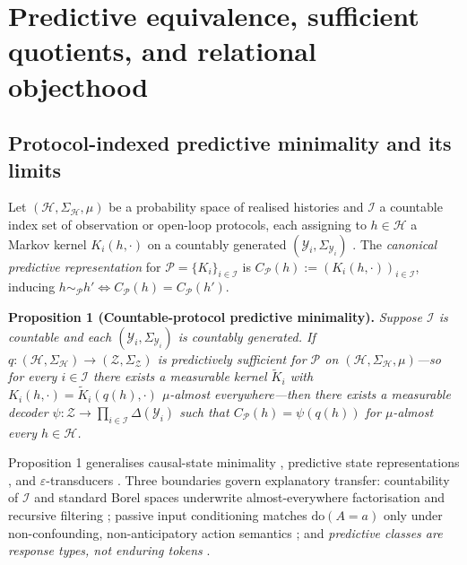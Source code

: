 \documentclass[12pt,letterpaper]{article}
\begin{document}
\section{Predictive equivalence, sufficient quotients, and relational
objecthood}\label{predictive-equivalence-sufficient-quotients-and-relational-objecthood}

\subsection{Protocol-indexed predictive minimality and its
limits}\label{protocol-indexed-predictive-minimality-and-its-limits}

Let \((\mathcal{H}, \Sigma_{\mathcal{H}}, \mu)\) be a probability space
of realised histories and \(\mathcal{I}\) a countable index set of
observation or open-loop protocols, each assigning to
\(h \in \mathcal{H}\) a Markov kernel \(K_i(h, \cdot)\) on a countably
generated \((\mathcal{Y}_i, \Sigma_{\mathcal{Y}_i})\)
\citep{blackwell1953, kallenberg2021}. The \emph{canonical predictive
representation} for \(\mathcal{P} = \{K_i\}_{i \in \mathcal{I}}\) is
\(C_{\mathcal{P}}(h) := (K_i(h, \cdot))_{i \in \mathcal{I}}\), inducing
\(h \sim_{\mathcal{P}} h' \iff C_{\mathcal{P}}(h) = C_{\mathcal{P}}(h')\).

\textbf{Proposition 1 (Countable-protocol predictive minimality).}
\emph{Suppose \(\mathcal{I}\) is countable and each
\((\mathcal{Y}_i, \Sigma_{\mathcal{Y}_i})\) is countably generated. If
\(q: (\mathcal{H}, \Sigma_{\mathcal{H}}) \to (\mathcal{Z}, \Sigma_{\mathcal{Z}})\)
is predictively sufficient for \(\mathcal{P}\) on
\((\mathcal{H}, \Sigma_{\mathcal{H}}, \mu)\)---so for every
\(i \in \mathcal{I}\) there exists a measurable kernel
\(\widetilde{K}_i\) with
\(K_i(h, \cdot) = \widetilde{K}_i(q(h), \cdot)\) \(\mu\)-almost
everywhere---then there exists a measurable decoder
\(\psi: \mathcal{Z} \to \prod_{i \in \mathcal{I}} \Delta(\mathcal{Y}_i)\)
such that \(C_{\mathcal{P}}(h) = \psi(q(h))\) for \(\mu\)-almost every
\(h \in \mathcal{H}\).}

Proposition 1 generalises causal-state minimality
\citep{crutchfieldYoung1989, shaliziCrutchfield2001}, predictive state
representations \citep{littmanSuttonSingh2001}, and
\(\varepsilon\)-transducers \citep{barnettCrutchfield2015}. Three
boundaries govern explanatory transfer: countability of \(\mathcal{I}\)
and standard Borel spaces underwrite almost-everywhere factorisation and
recursive filtering \citep{astrom1965, kaelbling1998}; passive input
conditioning matches \(\mathrm{do}(A=a)\) only under non-confounding,
non-anticipatory action semantics \citep{pearl2009, woodward2003}; and
\emph{predictive classes are response types, not enduring tokens}
\citep{wiggins2001}.
\end{document}
